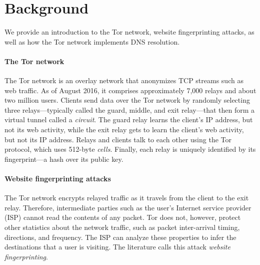 \section{Background}
\label{sec:background}
We provide an introduction to the Tor network, website fingerprinting
attacks, as well as how the Tor network implements DNS resolution.

\paragraph{The Tor network}
The Tor network is an overlay network that anonymizes TCP streams such as web
traffic.  As of August 2016, it comprises approximately 7,000 relays and about two
million users.  Clients send data over the Tor network by randomly selecting
three relays---typically called the guard, middle, and exit relay---that then
form a virtual tunnel called a \emph{circuit}.  The guard relay learns the
client's IP address, but not its web activity, while the exit relay gets to
learn the client's web activity, but not its IP address.  Relays and clients
talk to each other using the Tor protocol, which uses 512-byte \emph{cells}.
Finally, each relay is uniquely identified by its fingerprint---a hash over its
public key.

\paragraph{Website fingerprinting attacks}
The Tor network encrypts relayed traffic as it travels from the client
to the exit relay.  Therefore, intermediate parties such as the user's
Internet service provider (ISP) cannot read the contents of any packet.
Tor does not, however, protect other statistics about the network
traffic, such as packet inter-arrival timing, directions, and frequency.
The ISP can analyze these properties to infer the destinations that a
user is visiting.  The literature calls this attack \emph{website
fingerprinting}.

